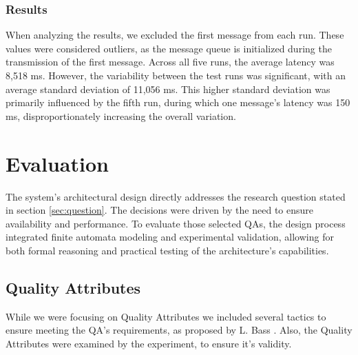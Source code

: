 \documentclass[conference]{IEEEtran}
\begin{document}
\subsubsection{Results}
When analyzing the results, we excluded the first message from each run. These values were considered outliers, as the message queue is initialized during the transmission of the first message. Across all five runs, the average latency was 8,518 ms. However, the variability between the test runs was significant, with an average standard deviation of 11,056 ms. This higher standard deviation was primarily influenced by the fifth run, during which one message's latency was 150 ms, disproportionately increasing the overall variation.

\section{Evaluation}




The system’s architectural design directly addresses the research question stated in section \ref{sec:question}. The decisions were driven by the need to ensure availability and performance. To evaluate those selected QAs, the design process integrated finite automata modeling and experimental validation, allowing for both formal reasoning and practical testing of the architecture's capabilities.

\subsection{Quality Attributes}
While we were focusing on Quality Attributes we included several tactics to ensure meeting the QA's requirements, as proposed by L. Bass \cite{b1}. Also, the Quality Attributes were examined by the experiment, to ensure it's validity. 
\end{document}
